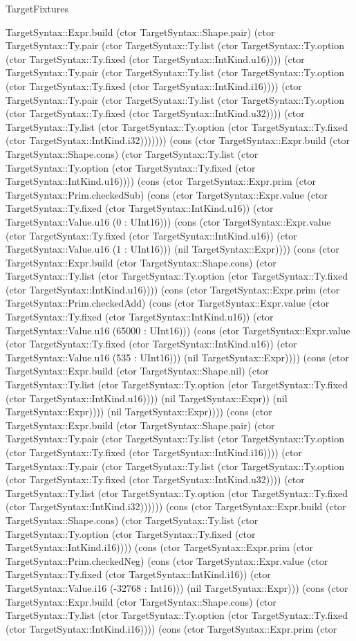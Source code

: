 \begin{lexlean}{TargetFixtures}
\begin{semanticmodule}
{TargetSyntax::Expr.build (ctor TargetSyntax::Shape.pair) (ctor TargetSyntax::Ty.pair (ctor TargetSyntax::Ty.list (ctor TargetSyntax::Ty.option (ctor TargetSyntax::Ty.fixed (ctor TargetSyntax::IntKind.u16)))) (ctor TargetSyntax::Ty.pair (ctor TargetSyntax::Ty.list (ctor TargetSyntax::Ty.option (ctor TargetSyntax::Ty.fixed (ctor TargetSyntax::IntKind.i16)))) (ctor TargetSyntax::Ty.pair (ctor TargetSyntax::Ty.list (ctor TargetSyntax::Ty.option (ctor TargetSyntax::Ty.fixed (ctor TargetSyntax::IntKind.u32)))) (ctor TargetSyntax::Ty.list (ctor TargetSyntax::Ty.option (ctor TargetSyntax::Ty.fixed (ctor TargetSyntax::IntKind.i32))))))) (cons (ctor TargetSyntax::Expr.build (ctor TargetSyntax::Shape.cons) (ctor TargetSyntax::Ty.list (ctor TargetSyntax::Ty.option (ctor TargetSyntax::Ty.fixed (ctor TargetSyntax::IntKind.u16)))) (cons (ctor TargetSyntax::Expr.prim (ctor TargetSyntax::Prim.checkedSub) (cons (ctor TargetSyntax::Expr.value (ctor TargetSyntax::Ty.fixed (ctor TargetSyntax::IntKind.u16)) (ctor TargetSyntax::Value.u16 (0 : UInt16))) (cons (ctor TargetSyntax::Expr.value (ctor TargetSyntax::Ty.fixed (ctor TargetSyntax::IntKind.u16)) (ctor TargetSyntax::Value.u16 (1 : UInt16))) (nil TargetSyntax::Expr)))) (cons (ctor TargetSyntax::Expr.build (ctor TargetSyntax::Shape.cons) (ctor TargetSyntax::Ty.list (ctor TargetSyntax::Ty.option (ctor TargetSyntax::Ty.fixed (ctor TargetSyntax::IntKind.u16)))) (cons (ctor TargetSyntax::Expr.prim (ctor TargetSyntax::Prim.checkedAdd) (cons (ctor TargetSyntax::Expr.value (ctor TargetSyntax::Ty.fixed (ctor TargetSyntax::IntKind.u16)) (ctor TargetSyntax::Value.u16 (65000 : UInt16))) (cons (ctor TargetSyntax::Expr.value (ctor TargetSyntax::Ty.fixed (ctor TargetSyntax::IntKind.u16)) (ctor TargetSyntax::Value.u16 (535 : UInt16))) (nil TargetSyntax::Expr)))) (cons (ctor TargetSyntax::Expr.build (ctor TargetSyntax::Shape.nil) (ctor TargetSyntax::Ty.list (ctor TargetSyntax::Ty.option (ctor TargetSyntax::Ty.fixed (ctor TargetSyntax::IntKind.u16)))) (nil TargetSyntax::Expr)) (nil TargetSyntax::Expr)))) (nil TargetSyntax::Expr)))) (cons (ctor TargetSyntax::Expr.build (ctor TargetSyntax::Shape.pair) (ctor TargetSyntax::Ty.pair (ctor TargetSyntax::Ty.list (ctor TargetSyntax::Ty.option (ctor TargetSyntax::Ty.fixed (ctor TargetSyntax::IntKind.i16)))) (ctor TargetSyntax::Ty.pair (ctor TargetSyntax::Ty.list (ctor TargetSyntax::Ty.option (ctor TargetSyntax::Ty.fixed (ctor TargetSyntax::IntKind.u32)))) (ctor TargetSyntax::Ty.list (ctor TargetSyntax::Ty.option (ctor TargetSyntax::Ty.fixed (ctor TargetSyntax::IntKind.i32)))))) (cons (ctor TargetSyntax::Expr.build (ctor TargetSyntax::Shape.cons) (ctor TargetSyntax::Ty.list (ctor TargetSyntax::Ty.option (ctor TargetSyntax::Ty.fixed (ctor TargetSyntax::IntKind.i16)))) (cons (ctor TargetSyntax::Expr.prim (ctor TargetSyntax::Prim.checkedNeg) (cons (ctor TargetSyntax::Expr.value (ctor TargetSyntax::Ty.fixed (ctor TargetSyntax::IntKind.i16)) (ctor TargetSyntax::Value.i16 (-32768 : Int16))) (nil TargetSyntax::Expr))) (cons (ctor TargetSyntax::Expr.build (ctor TargetSyntax::Shape.cons) (ctor TargetSyntax::Ty.list (ctor TargetSyntax::Ty.option (ctor TargetSyntax::Ty.fixed (ctor TargetSyntax::IntKind.i16)))) (cons (ctor TargetSyntax::Expr.prim (ctor }
\end{semanticmodule}
\end{lexlean}
